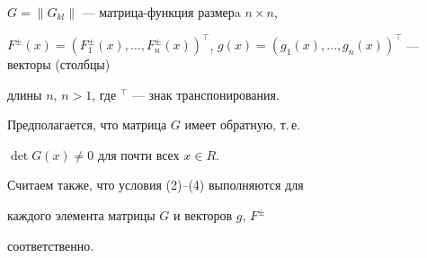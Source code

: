 $G=\|G_{kl}\|$ --- матрица-функция размерa $n\times n$,


$F^\pm(x)=(F^\pm_1(x),\dotsc,


F^\pm_n(x))^\top$, $g(x)=(g_1(x),\dotsc,g_n(x))^\top$ --- векторы (столбцы)


длины $n$, $n>1$, где $^\top$ --- знак транспонирования.





Предполагается, что матрица $G$ имеет обратную, т.\,е.


$\det G(x)\neq 0$ для почти всех $x\in R$.


Считаем также, что условия (2)--(4) выполняются для


каждого элемента матрицы $G$ и векторов $g$, $F^\pm$


соответственно. 





